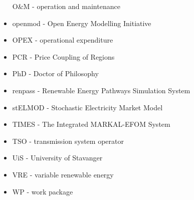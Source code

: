 \begin{itemize}
  O\&M - operation and maintenance
\item
  openmod - Open Energy Modelling Initiative
\item
  OPEX - operational expenditure
\item
  PCR - Price Coupling of Regions
\item
  PhD - Doctor of Philosophy
\item
  renpass - Renewable Energy Pathways Simulation System
\item
  stELMOD - Stochastic Electricity Market Model
\item
  TIMES - The Integrated MARKAL-EFOM System
\item
  TSO - transmission system operator
\item
  UiS - University of Stavanger
\item
  VRE - variable renewable energy
\item
  WP - work package
\end{itemize}
